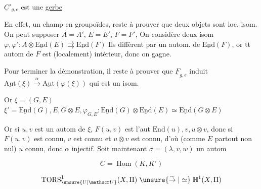  $\underline C'_{g,e}$ est une \uline{gerbe} 


En effet,  un champ en groupoïdes,  reste à prouver que
deux objets sont loc. isom. On peut supposer $A=A'$, $E=E'$, $F=F'$,
On considère deux isom $\varphi,\varphi':A\otimes\underline{\mathrm{End}}(E)\rightrightarrows\underline{\mathrm{End}}(F)$
Ils diffèrent par un autom.  de $\underline{\mathrm{End}}(F)$,  or tt autom
de $F$ est (localement) intérieur, donc on gagne. 

Pour terminer la démonstration, il reste à prouver
que $\underline F_{g,e}$ induit $\underline{\mathrm{Aut}}(\xi)\xrightarrow{\alpha}\underline{\mathrm{Aut}}(\varphi(\xi))$ qui est un isom.

Or $\xi=(G,E)$ $\xi'=\underline{\mathrm{End}}(G),E,G\otimes E,\varphi_{G,E}:\underline{\mathrm{End}}(G)\otimes\underline{\mathrm{End}}(E)\simeq\underline{\mathrm{End}}(G\otimes E)$

Or si $u,v$ est un autom de $\xi$, $F(u,v)$ est l'aut
$\mathrm{End}(u),v,u\otimes v$, donc si $F(u,v)$ est connu, $v$ est connu et
$u\otimes v$ est connu, d'où  (comme $E$ partout non nul) $u$ connu,
donc $\alpha$ injectif. Soit maintenant $\sigma=(\lambda,v,w)$ un autom



\[
C=\underline{\operatorname{Hom}}(K,K')
\]

\[
\mathrm{TORS}_{\unsure{U|\mathscr U}}^{1}(X,\Pi)\mathrel{\unsure{\overset{\sim}{\to}|\simeq}}\mathbb H^1(X,\Pi)
\]

